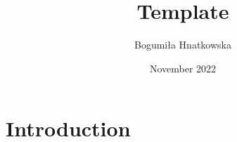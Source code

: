 \documentclass{article}
\title{Template}
\author{Bogumiła Hnatkowska}
\date{November 2022}
\begin{document}
\maketitle

\section{Introduction}
\end{document}
